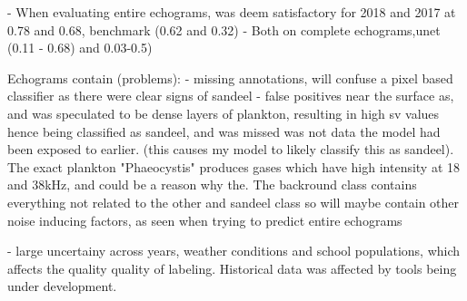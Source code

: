         - When evaluating entire echograms, was deem satisfactory for 2018 and 2017 at 0.78 and 0.68, benchmark (0.62 and 0.32)
        - Both on complete echograms,unet (0.11 - 0.68) and 0.03-0.5)
    
    Echograms contain (problems): 
    - missing annotations, will confuse a pixel based classifier as there were clear signs of sandeel
    - false positives near the surface as, and was speculated to be dense layers of plankton, resulting in high sv values hence being classified as sandeel, and was missed was not data the model had been exposed to earlier. (this causes my model to likely classify this as sandeel). The exact plankton "Phaeocystis" produces gases which have high intensity at 18 and 38kHz, and could be a reason why the. The backround class contains everything not related to the other and sandeel class so will maybe contain other noise inducing factors, as seen when trying to predict entire echograms  
    
    - large uncertainy across years, weather conditions and school populations,  which affects the quality quality of labeling. Historical data was affected by tools being under development.
    
    
    
    
    
    
    
    
    
    
    
    
